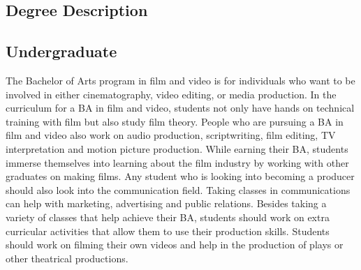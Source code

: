 \begin{multicols}{2}

\section{Degree Description}
    \subsection{Undergraduate}
		The Bachelor of Arts program in film and video is for individuals who want to be involved in either cinematography, video editing, or media production. In the curriculum for a BA in film and video, students not only have hands on technical training with film but also study film theory. People who are pursuing a BA in film and video also work on audio production, scriptwriting, film editing, TV interpretation and motion picture production. While earning their BA, students immerse themselves into learning about the film industry by working with other graduates on making films. Any student who is looking into becoming a producer should also look into the communication field. Taking classes in communications can help with marketing, advertising and public relations. Besides taking a variety of classes that help achieve their BA, students should work on extra curricular activities that allow them to use their production skills. Students should work on filming their own videos and help in the production of plays or other theatrical productions.

\end{multicols}
